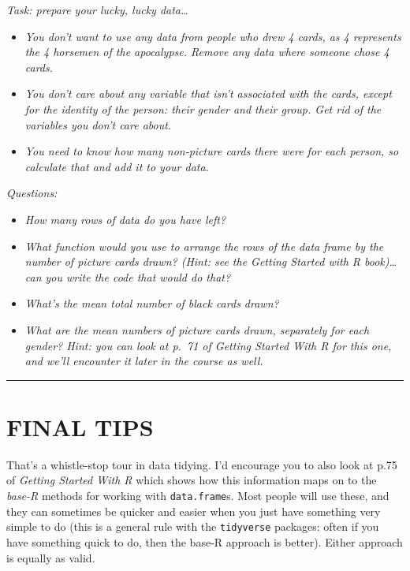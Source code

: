 \documentclass[
]{book}
\providecommand{\tightlist}{%
  \setlength{\itemsep}{0pt}\setlength{\parskip}{0pt}}
\begin{document}
\emph{Task: prepare your lucky, lucky data\ldots{}}

\begin{itemize}
\tightlist
\item
  \emph{You don't want to use any data from people who drew 4 cards, as 4 represents
  the 4 horsemen of the apocalypse. Remove any data where someone chose 4 cards.}
\item
  \emph{You don't care about any variable that isn't associated with the cards, except
  for the identity of the person: their gender and their group. Get rid of the
  variables you don't care about.}
\item
  \emph{You need to know how many non-picture cards there were for each person, so
  calculate that and add it to your data.}\\
\end{itemize}

\emph{Questions:}

\begin{itemize}
\tightlist
\item
  \emph{How many rows of data do you have left?}
\item
  \emph{What function would you use to arrange the rows of the data frame by the number of
  picture cards drawn? (Hint: see the Getting Started with R book)\ldots{} can you
  write the code that would do that?}
\item
  \emph{What's the mean total number of black cards drawn?}
\item
  \emph{What are the mean numbers of picture cards drawn, separately for each gender?
  Hint: you can look at p.~71 of Getting Started With R for this one, and we'll
  encounter it later in the course as well.}\\
\end{itemize}

\begin{center}\rule{0.5\linewidth}{\linethickness}\end{center}

\hypertarget{final-tips}{%
\section{FINAL TIPS}\label{final-tips}}

That's a whistle-stop tour in data tidying. I'd encourage you to also look at
p.75 of \emph{Getting Started With R} which shows how this information maps on to
the \emph{base-R} methods for working with \texttt{data.frame}s. Most people will use these,
and they can sometimes be quicker and easier when you just have something
very simple to do (this is a general rule with the \texttt{tidyverse} packages:
often if you have something quick to do, then the base-R approach is better).
Either approach is equally as valid.\\
~\\
\end{document}
